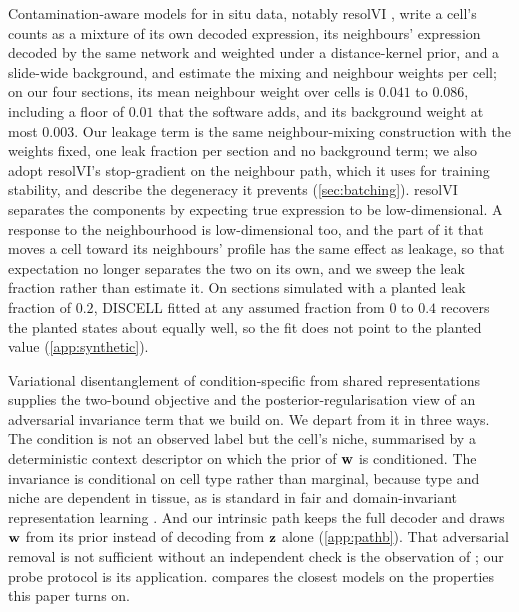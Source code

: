 Contamination-aware models for in situ data, notably resolVI \citep{ergen2025}, write a cell's counts as a mixture of its own decoded expression, its neighbours' expression decoded by the same network and weighted under a distance-kernel prior, and a slide-wide background, and estimate the mixing and neighbour weights per cell; on our four sections, its mean neighbour weight over cells is $0.041$ to $0.086$, including a floor of $0.01$ that the software adds, and its background weight at most $0.003$. Our leakage term is the same neighbour-mixing construction with the weights fixed, one leak fraction per section and no background term; we also adopt resolVI's stop-gradient on the neighbour path, which it uses for training stability, and describe the degeneracy it prevents (\cref{sec:batching}). resolVI separates the components by expecting true expression to be low-dimensional. A response to the neighbourhood is low-dimensional too, and the part of it that moves a cell toward its neighbours' profile has the same effect as leakage, so that expectation no longer separates the two on its own, and we sweep the leak fraction rather than estimate it. On sections simulated with a planted leak fraction of $0.2$, DISCELL fitted at any assumed fraction from $0$ to $0.4$ recovers the planted states about equally well, so the fit does not point to the planted value (\cref{app:synthetic}).

Variational disentanglement of condition-specific from shared representations \citep{klys2018,slavutsky2025} supplies the two-bound objective and the posterior-regularisation view of an adversarial invariance term \citep{ganchev2010} that we build on. We depart from it in three ways. The condition is not an observed label but the cell's niche, summarised by a deterministic context descriptor on which the prior of $\mathbf{w}$ is conditioned. The invariance is conditional on cell type rather than marginal, because type and niche are dependent in tissue, as is standard in fair and domain-invariant representation learning \citep{madras2018,li2018ciddg,pogodin2023circe}. And our intrinsic path keeps the full decoder and draws $\mathbf{w}$ from its prior instead of decoding from $\mathbf{z}$ alone (\cref{app:pathb}). That adversarial removal is not sufficient without an independent check is the observation of \citet{elazar2018}; our probe protocol is its application.  compares the closest models on the properties this paper turns on.


